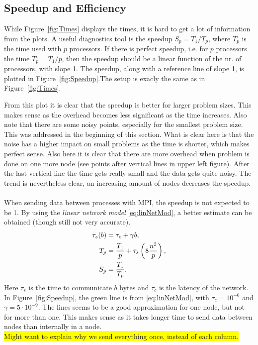 \subsection{Speedup and Efficiency}
While Figure~\ref{fig:Times} displays the times, it is hard to get a lot of information from the plots. A useful diagnostics tool is the speedup $S_p=T_1/T_p$, where $T_p$ is the time used with $p$ processors. If there is perfect speedup, i.e. for $p$ processors the time $T_p = T_1/p$, then the speedup should be a linear function of the nr. of processors, with slope 1. The speedup, along with a reference line of slope 1, is plotted in Figure~\ref{fig:Speedup}.The setup is exacly the same as in Figure~\ref{fig:Times}.

From this plot it is clear that the speedup is better for larger problem sizes. This makes sense as the overhead becomes less significant as the time increases. Also note that there are some noisy points, especially for the smallest problem size. This was addressed in the beginning of this section. What is clear here is that the noise has a higher impact on small problems as the time is shorter, which makes perfect sense. Also here it is clear that there are more overhead when problem is done on one more node (see points after vertical lines in upper left figure). After the last vertical line the time gets really small and the data gets quite noisy.
The trend is nevertheless clear, an increasing amount of nodes decreases the speedup. \\
\\
When sending data between processes with MPI, the speedup is not expected to be 1. By using the \textit{linear network model} \eqref{eq:linNetMod}, a better estimate can be obtained (though still not very accurate).
\begin{align}
  \tau_s(b) &= \tau_c + \gamma b, \notag \\
  \label{eq:linNetMod} 
  T_p &= \frac{T_1}{p} + \tau_s \left(  8 \frac{n^2}{p}\right), \\
  S_p &= \frac{T_1}{T_p}. \notag 
\end{align}
Here $\tau_s$ is the time to communicate $b$ bytes and $\tau_c$ is the latency of the network. In Figure~\ref{fig:Speedup}, the green line is from \eqref{eq:linNetMod}, with $\tau_c = 10^{-6}$ and $\gamma = 5 \cdot 10^{-9}$. The lines seems to be a good approximation for one node, but not for more than one. This makes sense as it takes longer time to send data between nodes than internally in a node.
\\ \colorbox{yellow}{Might want to explain why we send everything once, instead of each column.}\\
